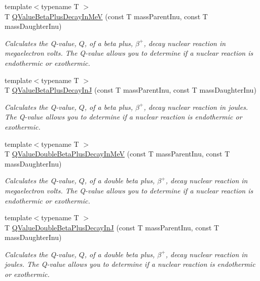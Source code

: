 \begin{DoxyCompactItemize}
{\footnotesize template$<$typename T $>$ }\\T \mbox{\hyperlink{group___e_g_x_phys-_q_value-_beta_plus_ga3c4f7ec8e7c44d01d3aee6447a5ab443}{Q\+Value\+Beta\+Plus\+Decay\+In\+MeV}} (const T mass\+Parent\+Inu, const T mass\+Daughter\+Inu)
\begin{DoxyCompactList}\small\item\em Calculates the Q-\/value, $Q$, of a beta plus, $\beta^+$, decay nuclear reaction in megaelectron volts. The Q-\/value allows you to determine if a nuclear reaction is endothermic or exothermic. \end{DoxyCompactList}\item 
{\footnotesize template$<$typename T $>$ }\\T \mbox{\hyperlink{group___e_g_x_phys-_q_value-_beta_plus_gaaee51753f077c9fe05188aa5b24f642e}{Q\+Value\+Beta\+Plus\+Decay\+InJ}} (const T mass\+Parent\+Inu, const T mass\+Daughter\+Inu)
\begin{DoxyCompactList}\small\item\em Calculates the Q-\/value, $Q$, of a beta plus, $\beta^+$, decay nuclear reaction in joules. The Q-\/value allows you to determine if a nuclear reaction is endothermic or exothermic. \end{DoxyCompactList}\item 
{\footnotesize template$<$typename T $>$ }\\T \mbox{\hyperlink{group___e_g_x_phys-_q_value-_beta_plus_gab78be314eac63ddbce441b4c8b22b47d}{Q\+Value\+Double\+Beta\+Plus\+Decay\+In\+MeV}} (const T mass\+Parent\+Inu, const T mass\+Daughter\+Inu)
\begin{DoxyCompactList}\small\item\em Calculates the Q-\/value, $Q$, of a double beta plus, $\beta^+$, decay nuclear reaction in megaelectron volts. The Q-\/value allows you to determine if a nuclear reaction is endothermic or exothermic. \end{DoxyCompactList}\item 
{\footnotesize template$<$typename T $>$ }\\T \mbox{\hyperlink{group___e_g_x_phys-_q_value-_beta_plus_ga3531ffda0c561a601a61f54f5c7780df}{Q\+Value\+Double\+Beta\+Plus\+Decay\+InJ}} (const T mass\+Parent\+Inu, const T mass\+Daughter\+Inu)
\begin{DoxyCompactList}\small\item\em Calculates the Q-\/value, $Q$, of a double beta plus, $\beta^+$, decay nuclear reaction in joules. The Q-\/value allows you to determine if a nuclear reaction is endothermic or exothermic. \end{DoxyCompactList}\item 

\end{DoxyCompactItemize}

